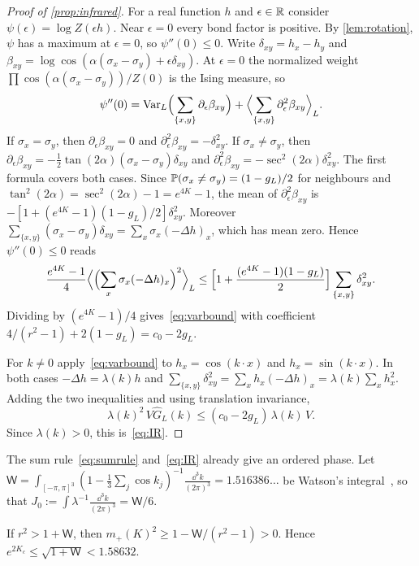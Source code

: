\begin{proof}[Proof of \cref{prop:infrared}]
For a real function $h$ and $\epsilon\in\mathbb R$ consider $\psi(\epsilon)=\log Z(\epsilon h)$. Near $\epsilon=0$ every bond factor is positive. By \cref{lem:rotation}, $\psi$ has a maximum at $\epsilon=0$, so $\psi''(0)\le0$. Write $\delta_{xy}=h_x-h_y$ and $\beta_{xy}=\log\cos(\alpha(\sigma_x-\sigma_y)+\epsilon\delta_{xy})$. At $\epsilon=0$ the normalized weight $\prod\cos(\alpha(\sigma_x-\sigma_y))/Z(0)$ is the Ising measure, so
\[
 \psi''(0)=\mathrm{Var}_L\Bigl(\sum_{\{x,y\}}\partial_\epsilon\beta_{xy}\Bigr)+\Bigl\langle\sum_{\{x,y\}}\partial^2_\epsilon\beta_{xy}\Bigr\rangle_L .
\]
If $\sigma_x=\sigma_y$, then $\partial_\epsilon\beta_{xy}=0$ and $\partial_\epsilon^2\beta_{xy}=-\delta_{xy}^2$. If $\sigma_x\ne\sigma_y$, then $\partial_\epsilon\beta_{xy}=-\frac12\tan(2\alpha)(\sigma_x-\sigma_y)\delta_{xy}$ and $\partial_\epsilon^2\beta_{xy}=-\sec^2(2\alpha)\delta_{xy}^2$. The first formula covers both cases. Since $\mathbb P(\sigma_x\ne\sigma_y)=(1-g_L)/2$ for neighbours and $\tan^2(2\alpha)=\sec^2(2\alpha)-1=e^{4K}-1$, the mean of $\partial^2_\epsilon\beta_{xy}$ is $-[1+(e^{4K}-1)(1-g_L)/2]\delta_{xy}^2$. Moreover $\sum_{\{x,y\}}(\sigma_x-\sigma_y)\delta_{xy}=\sum_x\sigma_x(-\Delta h)_x$, which has mean zero. Hence $\psi''(0)\le0$ reads
\[
 \frac{e^{4K}-1}4\Bigl\langle\Bigl(\sum_x\sigma_x(-\Delta h)_x\Bigr)^2\Bigr\rangle_L\le\Bigl[1+\frac{(e^{4K}-1)(1-g_L)}2\Bigr]\sum_{\{x,y\}}\delta_{xy}^2 .
\]
Dividing by $(e^{4K}-1)/4$ gives~\eqref{eq:varbound} with coefficient $4/(r^2-1)+2(1-g_L)=c_0-2g_L$.

For $k\ne0$ apply~\eqref{eq:varbound} to $h_x=\cos(k\cdot x)$ and $h_x=\sin(k\cdot x)$. In both cases $-\Delta h=\lambda(k)h$ and $\sum_{\{x,y\}}\delta_{xy}^2=\sum_xh_x(-\Delta h)_x=\lambda(k)\sum_xh_x^2$. Adding the two inequalities and using translation invariance,
\[
 \lambda(k)^2\,V\widehat G_L(k)\le(c_0-2g_L)\,\lambda(k)\,V .
\]
Since $\lambda(k)>0$, this is~\eqref{eq:IR}.
\end{proof}

The sum rule~\eqref{eq:sumrule} and~\eqref{eq:IR} already give an ordered phase. Let $\mathsf W=\int_{[-\pi,\pi]^3}(1-\frac13\sum_j\cos k_j)^{-1}\frac{\dd^3k}{(2\pi)^3}=1.516386\ldots$ be Watson's integral~\cite{Wat39}, so that $J_0:=\int\lambda^{-1}\frac{\dd^3k}{(2\pi)^3}=\mathsf W/6$.

\begin{corollary}\label{cor:singlesite}
If $r^2>1+\mathsf W$, then $m_+(K)^2\ge1-\mathsf W/(r^2-1)>0$. Hence $e^{2K_c}\le\sqrt{1+\mathsf W}<1.58632$.
\end{corollary}

